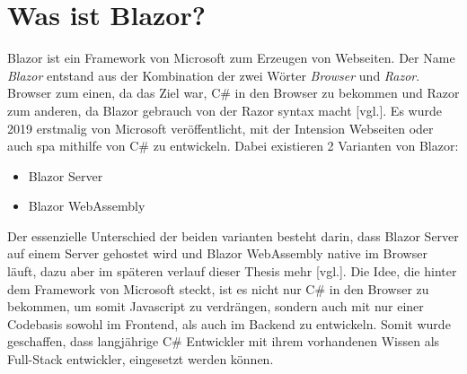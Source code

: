 \section{Was ist Blazor?}
\label{subsec:wasIstBlazor}
Blazor ist ein Framework von Microsoft zum Erzeugen von Webseiten. Der Name \emph{Blazor}
entstand aus der Kombination der zwei Wörter \emph{Browser} und \emph{Razor}. Browser zum einen,
da das Ziel war, C\# in den Browser zu bekommen und Razor zum anderen, da Blazor gebrauch von der
Razor syntax macht \cite{HierKommtBlazor}[vgl.]. Es wurde 2019 erstmalig von Microsoft
veröffentlicht, mit der Intension Webseiten oder auch \ac{spa} mithilfe von C\# zu entwickeln.
Dabei existieren 2 Varianten von Blazor:

\begin{itemize}
    \item Blazor Server
    \item Blazor WebAssembly
\end{itemize}
Der essenzielle Unterschied der beiden varianten besteht darin, dass Blazor Server auf einem
Server gehostet wird und Blazor WebAssembly native im Browser läuft, dazu aber im späteren
verlauf dieser Thesis mehr \cite{WasIstBlazor}[vgl.].
\newline
\newline
Die Idee, die hinter dem Framework von Microsoft steckt, ist es nicht nur C\# in den Browser zu
bekommen, um somit Javascript zu verdrängen, sondern auch mit nur einer Codebasis sowohl im
Frontend, als auch im Backend zu entwickeln. Somit wurde geschaffen, dass langjährige C\#
Entwickler mit ihrem vorhandenen Wissen als Full-Stack entwickler, eingesetzt werden können.
